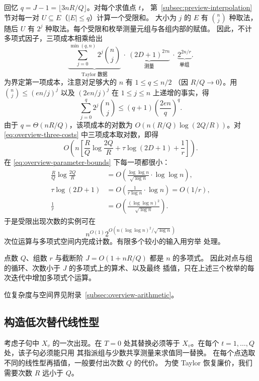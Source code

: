 \documentclass[11pt,reqno]{amsart}
\numberwithin{equation}{section}
\theoremstyle{definition}\newtheorem{definition}[theorem]{定义}
\theoremstyle{remark}\newtheorem{remark}[theorem]{注}
\renewcommand{\le}{\leqslant}
\begin{document}
回忆 $q=J-1=\lfloor3nR/Q\rfloor$。对每个求值点 $t$，
第~\ref{subsec:preview-interpolation} 节对每一对
$U\subseteq E$（$|E|\le q$）计算一个受限和。
大小为 $j$ 的 $E$ 有 $\binom nj$ 种取法，随后 $U$ 有 $2^j$
种取法。每个受限和枚举测量元组与各组内部的赋值。
因此，不计多项式因子，三项成本相乘给出
\begin{equation}\label{eq:overview-three-costs}
 \underbrace{\sum_{j=0}^{\min(q,n)}2^j\binom nj}_{\text{Taylor 数据}}
 \ \cdot\
 \underbrace{(2D+1)^{2\tau n}}_{\text{测量}}
 \ \cdot\
 \underbrace{2^{2n/r}}_{\text{单组}}.
\end{equation}
为界定第一项成本，注意对足够大的 $n$ 有 $1\le q\le n/2$
（因 $R/Q\to0$）。用 $\binom nj\le(en/j)^j$ 以及
$(2en/j)^j$ 在 $1\le j\le n$ 上递增的事实，得
\[
 \sum_{j=0}^q2^j\binom nj
 \le(q+1)\left(\frac{2en}{q}\right)^q.
\]
由于 $q=\Theta(nR/Q)$，该项成本的对数为
$O(n(R/Q)\log(2Q/R))$。对 \eqref{eq:overview-three-costs}
中三项成本取对数，即得
\[
 O\!\left(n\left[
       \frac RQ\log\frac{2Q}{R}
       +\tau\log(2D+1)+\frac1r\right]\right).
\]
在 \eqref{eq:overview-parameter-bounds} 下每一项都很小：
\[
 \begin{aligned}
 \frac RQ\log\frac{2Q}{R}
   &=O\!\left(\frac{\log\log n}{\sqrt{\log n}}
                      \cdot\log\log n\right),\\
 \tau\log(2D+1)&=O\!\left(\frac1{r\log n}\cdot\log n\right)
                  =O(1/r),\\
 \frac1r&=O\!\left(\frac{(\log\log n)^2}{\sqrt{\log n}}\right).
 \end{aligned}
\]
于是受限出现次数的实例可在
\begin{equation}\label{eq:overview-bounded-time}
 n^{O(1)}2^{O(n(\log\log n)^2/\sqrt{\log n})}
\end{equation}
次位运算与多项式空间内完成计数。有限多个较小的输入用穷举
处理。

点数 $Q$、组数 $r$ 与截断阶 $J=O(1+nR/Q)$ 都是 $n$ 的多项式。
因此对点与组的循环、次数小于 $J$ 的多项式上的算术、以及最终
插值，只在上述三个枚举的每次迭代中增加多项式个运算。

位复杂度与空间界见附录~\ref{subsec:overview-arithmetic}。

\subsection{构造低次替代线性型}
\label{subsec:preview-auxiliary}
考虑子句中 $X_v$ 的一次出现。在 $T=0$ 处其替换必须等于
$X_v$。在每个 $t=1,\ldots,Q$ 处，该子句必须能只用
其指派组与少数共享测量来求值同一替换。
在每个点选取不同的线性型再插值，一般要付出次数 $Q$ 的代价。
为使 Taylor 恢复廉价，我们需要次数 $R$ 远小于 $Q$。
\end{document}
